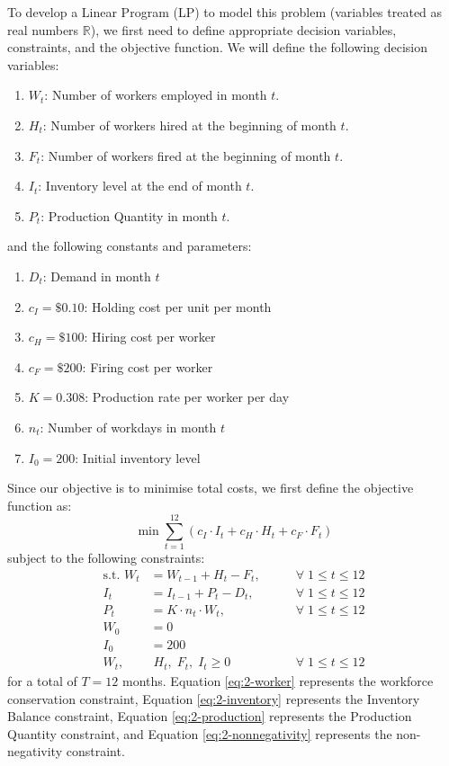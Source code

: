 \documentclass[12pt]{article}
\begin{document}
To develop a Linear Program (LP) to model this problem (variables treated as real numbers $ \mathbb{R}$), we first need to define appropriate decision variables, constraints, and the objective function. We will define the following decision variables: \begin{enumerate}
    \item $W_t$: Number of workers employed in month $t$.
    \item $H_t$: Number of workers hired at the beginning of month $t$. 
    \item $F_t$: Number of workers fired at the beginning of month $t$. 
    \item $I_t$: Inventory level at the end of month $t$. 
    \item $P_t$: Production Quantity in month $t$. 
\end{enumerate} and the following constants and parameters: \begin{enumerate}
    \item $D_t$: Demand in month $t$
    \item $c_I = \$0.10$: Holding cost per unit per month
    \item $c_H = \$100$: Hiring cost per worker
    \item $c_F = \$200$: Firing cost per worker
    \item $K = 0.308$: Production rate per worker per day
    \item $n_t$: Number of workdays in month $t$
    \item $I_{0} = 200$: Initial inventory level
\end{enumerate} Since our objective is to minimise total costs, we first define the objective function as: \begin{equation}
    \min \sum_{t=1}^{12} \left( c_I \cdot I_t + c_H \cdot H_t + c_F \cdot F_t \right)
\end{equation} subject to the following constraints: \begin{align}\label{eq:2-worker}
    \text{s.t. } W_t &= W_{t-1} + H_t - F_t, \qquad &\forall \; 1 \leq t \leq 12 \\ \label{eq:2-inventory}
    I_t &= I_{t-1} + P_t - D_t, \qquad &\forall \; 1\leq t\leq 12 \\ \label{eq:2-production}
    P_t &= K\cdot n_{t}\cdot W_t, \qquad &\forall \; 1\leq t\leq 12 \\ \nonumber
    W_{0} &= 0 \\ \nonumber
    I_{0} &= 200 \\ \label{eq:2-nonnegativity}
    W_t, &\;  H_t, \; F_t, \; I_t \geq 0 \qquad &\forall \; 1 \leq t \leq 12
\end{align} for a total of $T = 12$ months. Equation \ref{eq:2-worker} represents the workforce conservation constraint, Equation \ref{eq:2-inventory} represents the Inventory Balance constraint, Equation \ref{eq:2-production} represents the Production Quantity constraint, and Equation \ref{eq:2-nonnegativity} represents the non-negativity constraint. \\ 
\end{document}
